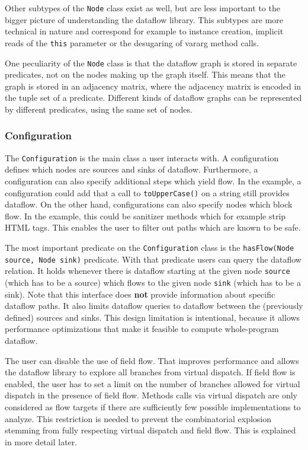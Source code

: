 Other subtypes of the \texttt{Node} class exist as well, 
but are less important to the bigger picture of understanding the dataflow library.
This subtypes are more technical in nature and correspond for example 
to instance creation, implicit reads of the \texttt{this} parameter or
the desugaring of vararg method calls.

One peculiarity of the \texttt{Node} class is that the dataflow graph
is stored in separate predicates, not on the nodes making up the graph itself.
This means that the graph is stored in an adjacency matrix, where the
 adjacency matrix is encoded in the tuple set of a predicate.
Different kinds of dataflow graphs can be represented by different predicates,
using the same set of nodes.

\subsubsection*{Configuration}
The \texttt{Configuration} is the main class a user interacts with.
A configuration defines which nodes are sources and sinks of dataflow.
Furthermore, a configuration can also specify additional steps which yield flow.
In the example, a configuration could add that a call to 
\texttt{toUpperCase()} on a string still provides dataflow.
On the other hand, configurations can also specify nodes which block flow.
In the example, this could be sanitizer methods which for example strip HTML tags.
This enables the user to filter out paths which are known to be safe.

The most important predicate on the \texttt{Configuration} class 
is the \texttt{hasFlow(Node source, Node sink)} predicate.
With that predicate users can query the dataflow relation.
It holds whenever there is dataflow starting at the given node \texttt{source} 
(which has to be a source) which flows to the given node \texttt{sink} (which has to be a sink).
Note that this interface does \textbf{not} provide information about specific
dataflow paths.
It also limits dataflow queries to dataflow between the (previously defined) sources and sinks.
This design limitation is intentional, because it allows performance optimizations
that make it feasible to compute whole-program dataflow.

The user can disable the use of field flow.
That improves performance and allows the dataflow library to explore all branches
from virtual dispatch.
If field flow is enabled, the user has to set a limit on the number of branches 
allowed for virtual dispatch in the presence of field flow.
Methods calls via virtual dispatch are only considered as flow targets if there are 
sufficiently few possible implementations to analyze.
This restriction is needed to prevent the combinatorial explosion stemming from
fully respecting virtual dispatch and field flow.
This is explained in more detail later.

